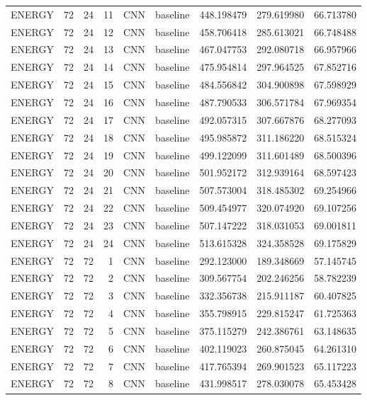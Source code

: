 \begin{table}
\begin{tabular}{lrrrllrrr}
ENERGY & 72 & 24 & 11 & CNN & baseline & 448.198479 & 279.619980 & 66.713780 \\
ENERGY & 72 & 24 & 12 & CNN & baseline & 458.706418 & 285.613021 & 66.748488 \\
ENERGY & 72 & 24 & 13 & CNN & baseline & 467.047753 & 292.080718 & 66.957966 \\
ENERGY & 72 & 24 & 14 & CNN & baseline & 475.954814 & 297.964525 & 67.852716 \\
ENERGY & 72 & 24 & 15 & CNN & baseline & 484.556842 & 304.900898 & 67.598929 \\
ENERGY & 72 & 24 & 16 & CNN & baseline & 487.790533 & 306.571784 & 67.969354 \\
ENERGY & 72 & 24 & 17 & CNN & baseline & 492.057315 & 307.667876 & 68.277093 \\
ENERGY & 72 & 24 & 18 & CNN & baseline & 495.985872 & 311.186220 & 68.515324 \\
ENERGY & 72 & 24 & 19 & CNN & baseline & 499.122099 & 311.601489 & 68.500396 \\
ENERGY & 72 & 24 & 20 & CNN & baseline & 501.952172 & 312.939164 & 68.597423 \\
ENERGY & 72 & 24 & 21 & CNN & baseline & 507.573004 & 318.485302 & 69.254966 \\
ENERGY & 72 & 24 & 22 & CNN & baseline & 509.454977 & 320.074920 & 69.107256 \\
ENERGY & 72 & 24 & 23 & CNN & baseline & 507.147222 & 318.031053 & 69.001811 \\
ENERGY & 72 & 24 & 24 & CNN & baseline & 513.615328 & 324.358528 & 69.175829 \\
ENERGY & 72 & 72 & 1 & CNN & baseline & 292.123000 & 189.348669 & 57.145745 \\
ENERGY & 72 & 72 & 2 & CNN & baseline & 309.567754 & 202.246256 & 58.782239 \\
ENERGY & 72 & 72 & 3 & CNN & baseline & 332.356738 & 215.911187 & 60.407825 \\
ENERGY & 72 & 72 & 4 & CNN & baseline & 355.798915 & 229.815247 & 61.725363 \\
ENERGY & 72 & 72 & 5 & CNN & baseline & 375.115279 & 242.386761 & 63.148635 \\
ENERGY & 72 & 72 & 6 & CNN & baseline & 402.119023 & 260.875045 & 64.261310 \\
ENERGY & 72 & 72 & 7 & CNN & baseline & 417.765394 & 269.901523 & 65.117223 \\
ENERGY & 72 & 72 & 8 & CNN & baseline & 431.998517 & 278.030078 & 65.453428 \\

\end{tabular}
\end{table}
